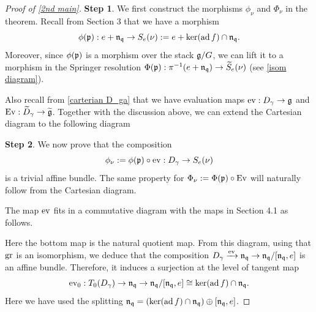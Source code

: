 \documentclass[11pt]{article}
\numberwithin{equation}{section}
\begin{document}
\begin{proof}[Proof of \cref{2nd main}]
\textbf{Step 1}. We first construct the morphisms $\phi_\nu$ and $\Phi_\nu$ in the theorem. Recall from Section 3 that we have a morphism $$\phi(\mathfrak{p}): e+ \mathfrak{n}_{\mathfrak{q}}\to S_e(\nu):= e+ \ker(\operatorname{ad} f)\cap \mathfrak{n}_{\mathfrak{q}}.$$ Moreover, since $\phi(\mathfrak{p})$ is a morphism over the stack $\mathfrak{g}/G$, we can lift it to a morphism in the Springer resolution $\Phi(\mathfrak{p}): \pi^{-1}(e+ \mathfrak{n}_{\mathfrak{q}})\to \widetilde{S}_e(\nu)$ (see \cref{isom diagram}). 

Also recall from \cref{carterian D_ga} that we have evaluation maps $\operatorname{ev}: D_\gamma\to \mathfrak{g}$ and $\operatorname{Ev}: \widetilde{D}_\gamma\to \widetilde{\mathfrak{g}}$. Together with the discussion above, we can extend the Cartesian diagram to the following diagram
\begin{center}
\end{center}
\textbf{Step 2}. We now prove that the composition
$$\phi_\nu:= \phi(\mathfrak{p})\circ \operatorname{ev}: D_\gamma\to S_e(\nu)$$
is a trivial affine bundle. The same property for $\Phi_\nu:= \Phi(\mathfrak{p})\circ \operatorname{Ev}$ will naturally follow from the Cartesian diagram.

The map $\operatorname{ev}$ fits in a commutative diagram with the maps in Section 4.1 as follows.
\begin{center}
\end{center}
Here the bottom map is the natural quotient map. From this diagram, using that $\operatorname{gr}$ is an isomorphism, we deduce that the composition $D_\gamma \xrightarrow{\operatorname{ev}} \mathfrak{n}_{\mathfrak{q}} \to \mathfrak{n}_{\mathfrak{q}}/[\mathfrak{n}_{\mathfrak{q}},e]$ is an affine bundle. Therefore, it induces a surjection at the level of tangent map  
$$\operatorname{ev}_0: T_{0}(D_\gamma)\to \mathfrak{n}_{\mathfrak{q}}\to \mathfrak{n}_{\mathfrak{q}}/[\mathfrak{n}_{\mathfrak{q}},e]\cong \ker(\operatorname{ad} f)\cap \mathfrak{n}_{\mathfrak{q}}.$$
Here we have used the splitting $\mathfrak{n}_{\mathfrak{q}}= (\ker(\operatorname{ad} f)\cap \mathfrak{n}_{\mathfrak{q}})\oplus [\mathfrak{n}_{\mathfrak{q}},e]$. 


\end{proof}
\end{document}
